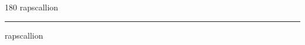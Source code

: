 
\begin{frame}
\begin{center}
\begin{turn}{180}
{\fontsize{2.5cm}{1em}\selectfont rapscallion}
\end{turn}
\vspace{1em}\par  
\hrule
\vspace{1em}\par  
{\fontsize{2.5cm}{1em}\selectfont rapscallion}
\end{center}
\end{frame}
